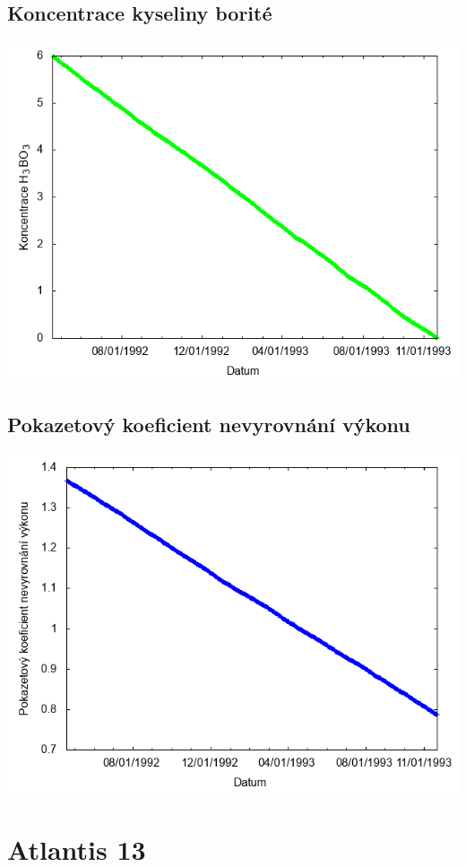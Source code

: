 \documentclass[a4paper,twoside,11pt]{article}
\begin{document}
\subsection*{Koncentrace kyseliny borité}
\begin{center}
\includegraphics[width=.8\textwidth]{graphs/Atlantis_12_bc.png}
\end{center}

\subsection*{Pokazetový koeficient nevyrovnání výkonu}
\begin{center}
\includegraphics[width=.8\textwidth]{graphs/Atlantis_12_fha.png}
\end{center}

\newpage
\section*{Atlantis 13}
\end{document}
